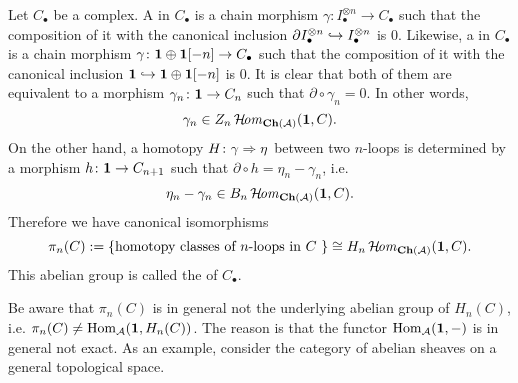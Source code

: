 {Let $C_{\bullet}$ be a complex. 
A  in $C_{\bullet}$ is a chain morphism 
$\gamma\colon I^{\otimes n}_{\bullet}\to C_{\bullet}$ such that 
the composition of it with the canonical inclusion 
$\partial I^{\otimes n}_{\bullet}\hookrightarrow I^{\otimes n}_{\bullet}$ 
is $0$. 
Likewise, a  in $C_{\bullet}$ is 
a chain morphism 
$\gamma\colon \mathbf{1}\oplus\mathbf{1}[-n]\to C_{\bullet}$ such that 
the composition of it with the canonical inclusion 
$\mathbf{1}\hookrightarrow\mathbf{1}\oplus\mathbf{1}[-n]$ is $0$. 
It is clear that both of them are equivalent to a morphism 
$\gamma_n\colon\mathbf{1}\to C_{n}$ such that $\partial\circ\gamma_n=0$. 
In other words, 
\[
\gamma_n\in Z_n\operatorname{\mathcal{H}\!\mathit{om}}_{\mathbf{Ch}({\cal A})}(\mathbf{1},C).
\] 
On the other hand, 
a homotopy $H\colon \gamma \Rightarrow \eta$ between two $n$-loops 
is determined by a morphism $h\colon\mathbf{1}\to C_{n+1}$ such that 
$\partial\circ h = \eta_n-\gamma_n$, i.e.
\[
\eta_n-\gamma_n\in B_n\operatorname{\mathcal{H}\!\mathit{om}}_{\mathbf{Ch}({\cal A})}(\mathbf{1},C).
\]
Therefore we have canonical isomorphisms
\[
\pi_n(C):=
\{\text{homotopy classes of $n$-loops in $C$ }\}
\cong
H_n\operatorname{\mathcal{H}\!\mathit{om}}_{\mathbf{Ch}({\cal A})}(\mathbf{1},C).
\]
This abelian group is called the 
 of $C_{\bullet}$.
}

\begin{Rem}
Be aware that $\pi_n(C)$ is in general not the underlying 
abelian group of $H_n(C)$, i.e. 
$\pi_n(C)\neq\operatorname{Hom}_{{\cal A}}(\mathbf{1},H_n(C))$. 
The reason is that the functor $\operatorname{Hom}_{{\cal A}}(\mathbf{1},-)$ is in general 
not exact. As an example, consider the category of abelian sheaves 
on a general topological space.
\end{Rem}

